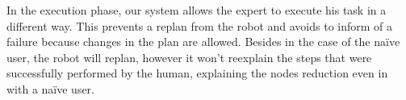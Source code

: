 \documentclass{llncs}
\begin{document}
In the execution phase, our system allows the expert to execute his task in a different way. This prevents a replan from the robot and avoids to inform of a failure because changes in the plan are allowed. Besides in the case of the na\"ive user, the robot will replan, however it won't reexplain the steps that were successfully performed by the human, explaining the nodes reduction even in with a na\"ive user.








\end{document}
